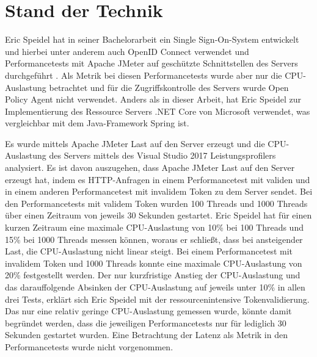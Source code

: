 \chapter{Stand der Technik}
\label{StandderTechnik}
Eric Speidel hat in seiner Bachelorarbeit ein Single Sign-On-System entwickelt und hierbei unter anderem auch OpenID Connect verwendet und Performancetests mit Apache JMeter auf geschützte Schnittstellen des Servers durchgeführt \citep{speidel:2017}. Als Metrik bei diesen Performancetests wurde aber nur die CPU-Auslastung betrachtet und für die Zugriffskontrolle des Servers wurde Open Policy Agent nicht verwendet. Anders als in dieser Arbeit, hat Eric Speidel zur Implementierung des Ressource Servers .NET Core von Microsoft verwendet, was vergleichbar mit dem Java-Framework Spring ist.\smallskip

Es wurde mittels Apache JMeter Last auf den Server erzeugt und die CPU-Auslastung des Servers mittels des Visual Studio 2017 Leistungsprofilers analysiert. Es ist davon auszugehen, dass Apache JMeter Last auf den Server erzeugt hat, indem es HTTP-Anfragen in einem Performancetest mit validen und in einem anderen Performancetest mit invalidem Token zu dem Server sendet. Bei den Performancetests mit validem Token wurden 100 Threads und 1000 Threads über einen Zeitraum von jeweils 30 Sekunden gestartet. Eric Speidel hat für einen kurzen Zeitraum eine maximale CPU-Auslastung von 10\% bei 100 Threads und 15\% bei 1000 Threads messen können, woraus er schließt, dass bei ansteigender Last, die CPU-Auslastung nicht linear steigt. Bei einem Performancetest mit invalidem Token und 1000 Threads konnte eine maximale CPU-Auslastung von 20\% festgestellt werden. Der nur kurzfristige Anstieg der CPU-Auslastung und das darauffolgende Absinken der CPU-Auslastung auf jeweils unter 10\% in allen drei Tests, erklärt sich Eric Speidel mit der ressourcenintensive Tokenvalidierung. Das nur eine relativ geringe CPU-Auslastung gemessen wurde, könnte damit begründet werden, dass die jeweiligen Performancetests nur für lediglich 30 Sekunden gestartet wurden. Eine Betrachtung der Latenz als Metrik in den Performancetests wurde nicht vorgenommen.\bigskip

